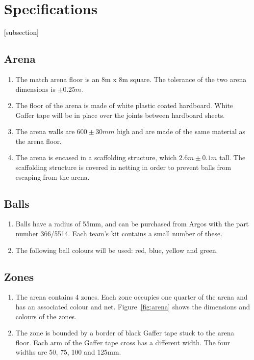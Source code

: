 \section{Specifications}
[subsection]
\newcommand{\rcnii}{\stepcounter{rulei}\arabic{section}.\arabic{subsection}.\arabic{rulei}}
\renewcommand{\labelenumi}{\rcnii}

\subsection{Arena}
\begin{enumerate}
\item The match arena floor is an 8m x 8m square.  The tolerance of the two arena dimensions is $\pm0.25m$.
\item The floor of the arena is made of white plastic coated hardboard.  White Gaffer tape will be in place over the joints between hardboard sheets.
\item The arena walls are $600\pm30mm$ high and are made of the same material as the arena floor.
\item The arena is encased in a scaffolding structure, which $2.6m \pm0.1m$ tall.  The scaffolding structure is covered in netting in order to prevent balls from escaping from the arena.
\end{enumerate}

\subsection{Balls}
\label{balls}
\begin {enumerate} 
\item Balls have a radius of 55mm, and can be purchased from Argos with the part number 366/5514.  Each team's kit contains a small number of these.
\item The following ball colours will be used: red, blue, yellow and green.
\end {enumerate}

\subsection{Zones}
\begin {enumerate}
\item The arena contains 4 zones.  Each zone occupies one quarter of the arena and has an associated colour and net.  Figure~\ref{fig:arena} shows the dimensions and colours of the zones.
\item The zone is bounded by a border of black Gaffer tape stuck to the arena floor.  Each arm of the Gaffer tape cross has a different width.  The four widths are 50, 75, 100 and 125mm.
\end {enumerate}

